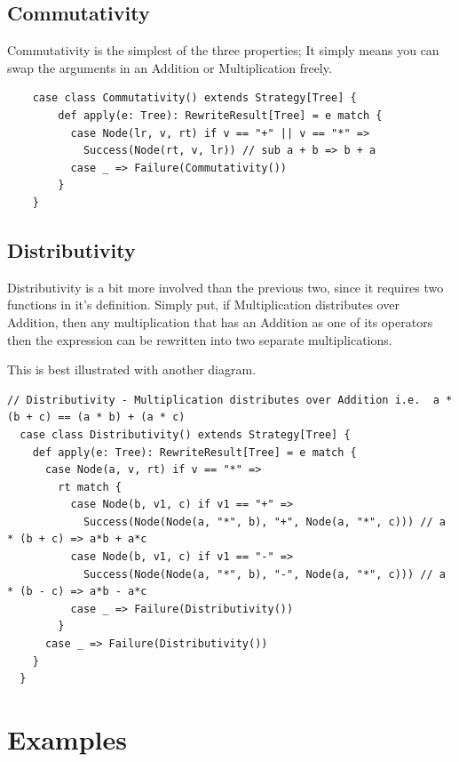 \documentclass{l4proj}
\begin{document}
\subsection{Commutativity}

Commutativity is the simplest of the three properties; It simply means you can swap the arguments in an Addition or Multiplication freely.




\begin{lstlisting}
    case class Commutativity() extends Strategy[Tree] {
        def apply(e: Tree): RewriteResult[Tree] = e match {
          case Node(lr, v, rt) if v == "+" || v == "*" =>
            Success(Node(rt, v, lr)) // sub a + b => b + a
          case _ => Failure(Commutativity())
        }
    }
\end{lstlisting}





\subsection{Distributivity}

Distributivity is a bit more involved than the previous two, since it requires two functions in it's definition. Simply put, if Multiplication distributes over Addition, then any multiplication that has an Addition as one of its operators then the expression can be rewritten into two separate multiplications.

This is best illustrated with another diagram.




\begin{lstlisting}
// Distributivity - Multiplication distributes over Addition i.e.  a * (b + c) == (a * b) + (a * c)
  case class Distributivity() extends Strategy[Tree] {
    def apply(e: Tree): RewriteResult[Tree] = e match {
      case Node(a, v, rt) if v == "*" =>
        rt match {
          case Node(b, v1, c) if v1 == "+" =>
            Success(Node(Node(a, "*", b), "+", Node(a, "*", c))) // a * (b + c) => a*b + a*c
          case Node(b, v1, c) if v1 == "-" =>
            Success(Node(Node(a, "*", b), "-", Node(a, "*", c))) // a * (b - c) => a*b - a*c 
          case _ => Failure(Distributivity())
        }
      case _ => Failure(Distributivity())
    }
  }
\end{lstlisting}



\section{Examples}
\end{document}
